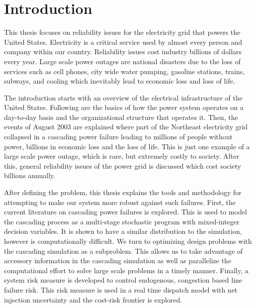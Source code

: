 \newcommand{\mypath}{../thesis}
\newcommand{\mypathintro}{../thesis/intro}
\chapter{Introduction}\label{intro-chapter}
This thesis focuses on reliability issues for the electricity grid that powers the United States.  Electricity is a critical service used by almost every person and company within our country.  Reliability issues cost industry billions of dollars every year.  Large scale power outages are national disasters due to the loss of services such as cell phones, city wide water pumping, gasoline stations, trains, subways, and cooling which inevitably lead to economic loss and loss of life.  

The introduction starts with an overview of the electrical infrastructure of the United States.  Following are the basics of how the power system operates on a day-to-day basis and the organizational structure that operates it. Then, the events of August 2003 are explained where part of the Northeast electricity grid collapsed in a cascading power failure leading to millions of people without power, billions in economic loss and the loss of life.  This is just one example of a large scale power outage, which is rare, but extremely costly to society. After this, general reliability issues of the power grid is discussed which cost society billions annually.
 
After defining the problem, this thesis explains the tools and methodology for attempting to make our system more robust against such failures.  First, the current literature on cascading power failures is explored.  This is used to model the cascading process as a multi-stage stochastic program with mixed-integer decision variables.  It is shown to have a similar distribution to the simulation, however is computationally difficult.  We turn to optimizing design problems with the cascading simulation as a subproblem.  This allows us to take advantage of accessory information in the cascading simulation as well as parallelize the computational effort to solve large scale problems in  a timely manner.  Finally, a system risk measure is developed to control endogenous, congestion based line failure risk.  This risk measure is used in a real time dispatch model with net injection uncertainty and the cost-risk frontier is explored.


